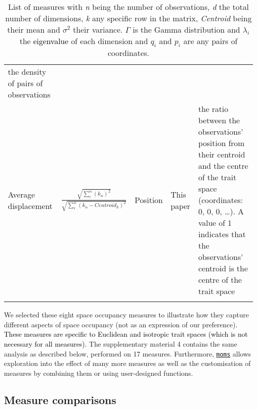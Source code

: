 \documentclass[]{article}
\begin{document}
\begin{longtable}[]{@{}lllll@{}}
\begin{minipage}[t]{0.11\columnwidth}
the density of pairs of observations\strut
\end{minipage}\tabularnewline
\begin{minipage}[t]{0.12333\columnwidth}\raggedright\strut
Average displacement\strut
\end{minipage} & \begin{minipage}[t]{0.23333\columnwidth}\raggedright\strut
\(\frac{\sqrt{\sum_{i}^{n}{({k}_{n})^2}}}{\sqrt{\sum_{i}^{n}{({k}_{n}-Centroid_{k})^2}}}\)\strut
\end{minipage} & \begin{minipage}[t]{0.08333\columnwidth}\raggedright\strut
Position\strut
\end{minipage} & \begin{minipage}[t]{0.11\columnwidth}\raggedright\strut
This paper\strut
\end{minipage} & \begin{minipage}[t]{0.26\columnwidth}\raggedright\strut
the ratio between the observations' position from their centroid and the
centre of the trait space (coordinates: 0, 0, 0, \ldots{}). A value of 1
indicates that the observations' centroid is the centre of the trait
space\strut
\end{minipage}\tabularnewline
\bottomrule
\caption{List of measures with \emph{n} being the number of
observations, \emph{d} the total number of dimensions, \emph{k} any
specific row in the matrix, \emph{Centroid} being their mean and
\(\sigma^{2}\) their variance. \(\Gamma\) is the Gamma distribution and
\(\lambda_{i}\) the \textcolor{black}{eigenvalue} of each
dimension and \({q}_{i}\) and \(p_{i}\) are any pairs of coordinates.}
\end{longtable}

\renewcommand\baselinestretch{1.6}\selectfont

We selected these eight space occupancy measures to illustrate how they
capture different aspects of space occupancy (not as an expression of
our preference).
\textcolor{black}{These measures are specific to Euclidean and isotropic trait spaces (which is not necessary for all measures).}
The supplementary material 4 contains the same analysis as described
below, performed on 17 measures. Furthermore,
\href{https://tguillerme.shinyapps.io/moms/}{\texttt{moms}} allows
exploration into the effect of many more measures as well as the
customisation of measures by combining them or using user-designed
functions.

\subsection{Measure comparisons}\label{measure-comparisons}
\end{document}

